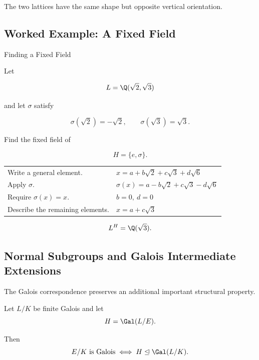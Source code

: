 The two lattices have the same shape but opposite vertical orientation.

\subsection{Worked Example: A Fixed Field}
\label{subsec:worked-fixed-field}

\begin{workedexamplebox}{Finding a Fixed Field}

Let

\[ L=\Q(\sqrt2,\sqrt3) \]

and let \(\sigma\) satisfy

\[ \sigma(\sqrt2)=-\sqrt2,\qquad\sigma(\sqrt3)=\sqrt3. \]

Find the fixed field of

\[ H=\{e,\sigma\}. \]

\begin{tabularx}{\textwidth}{@{}>{\raggedright\arraybackslash}p{}X@{}}
Write a general element. & \(x=a+b\sqrt2+c\sqrt3+d\sqrt6\)\\
Apply \(\sigma\). & \(\sigma(x)=a-b\sqrt2+c\sqrt3-d\sqrt6\)\\
Require \(\sigma(x)=x\). & \(b=0,\ d=0\)\\
Describe the remaining elements. & \(x=a+c\sqrt3\)
\end{tabularx}

\begin{answerbox}
\[ L^H=\Q(\sqrt3). \]
\end{answerbox}
\end{workedexamplebox}

\subsection{Normal Subgroups and Galois Intermediate Extensions}
\label{subsec:normal-subgroups-galois}

The Galois correspondence preserves an additional important structural
property.

\begin{theorem}
Let \(L/K\) be finite Galois and let
\[ H=\Gal(L/E). \]

Then
\[ E/K\text{ is Galois}\iff H\trianglelefteq\Gal(L/K). \]
\end{theorem}

